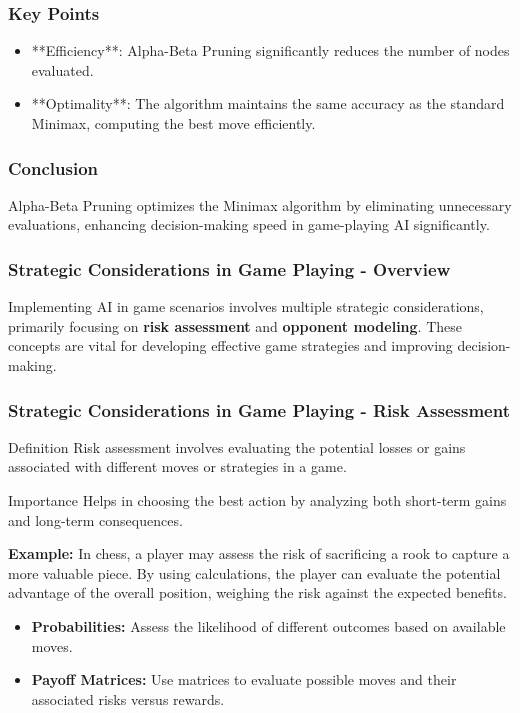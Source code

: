 \documentclass[aspectratio=169]{beamer}
\begin{document}
\begin{frame}[fragile]
    \frametitle{Key Points}
    \begin{itemize}
        \item **Efficiency**: Alpha-Beta Pruning significantly reduces the number of nodes evaluated.
        \item **Optimality**: The algorithm maintains the same accuracy as the standard Minimax, computing the best move efficiently.
    \end{itemize}
\end{frame}

\begin{frame}[fragile]
    \frametitle{Conclusion}
    Alpha-Beta Pruning optimizes the Minimax algorithm by eliminating unnecessary evaluations, enhancing decision-making speed in game-playing AI significantly.
\end{frame}

\begin{frame}[fragile]
    \frametitle{Strategic Considerations in Game Playing - Overview}
    Implementing AI in game scenarios involves multiple strategic considerations, primarily focusing on \textbf{risk assessment} and \textbf{opponent modeling}. These concepts are vital for developing effective game strategies and improving decision-making.
\end{frame}

\begin{frame}[fragile]
    \frametitle{Strategic Considerations in Game Playing - Risk Assessment}
    \begin{block}{Definition}
        Risk assessment involves evaluating the potential losses or gains associated with different moves or strategies in a game.
    \end{block}
    \begin{block}{Importance}
        Helps in choosing the best action by analyzing both short-term gains and long-term consequences.
    \end{block}
    
    \textbf{Example:} In chess, a player may assess the risk of sacrificing a rook to capture a more valuable piece. By using calculations, the player can evaluate the potential advantage of the overall position, weighing the risk against the expected benefits.

    \begin{itemize}
        \item \textbf{Probabilities:} Assess the likelihood of different outcomes based on available moves.
        \item \textbf{Payoff Matrices:} Use matrices to evaluate possible moves and their associated risks versus rewards.
    \end{itemize}
\end{frame}
\end{document}
